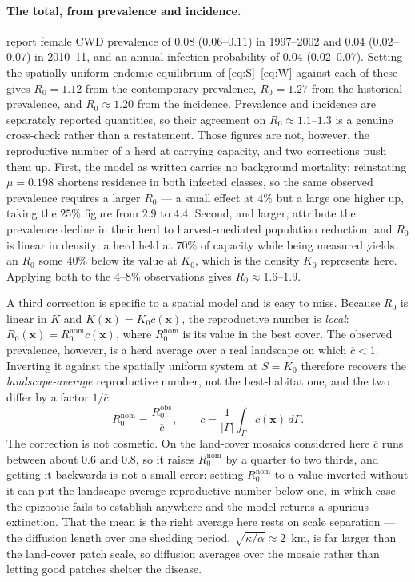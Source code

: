 \documentclass[11pt]{article}
\begin{document}
\paragraph{The total, from prevalence and incidence.} \citet{Geremia2015} report female CWD prevalence of $0.08$ ($0.06$--$0.11$) in 1997--2002 and $0.04$ ($0.02$--$0.07$) in 2010--11, and an annual infection probability of $0.04$ ($0.02$--$0.07$). Setting the spatially uniform endemic equilibrium of \eqref{eq:S}--\eqref{eq:W} against each of these gives $R_0 = 1.12$ from the contemporary prevalence, $R_0 = 1.27$ from the historical prevalence, and $R_0 \approx 1.20$ from the incidence. Prevalence and incidence are separately reported quantities, so their agreement on $R_0\approx1.1$--$1.3$ is a genuine cross-check rather than a restatement. Those figures are not, however, the reproductive number of a herd at carrying capacity, and two corrections push them up. First, the model as written carries no background mortality; reinstating $\mu = 0.198$ shortens residence in both infected classes, so the same observed prevalence requires a larger $R_0$ --- a small effect at $4\%$ but a large one higher up, taking the $25\%$ figure from $2.9$ to $4.4$. Second, and larger, \citeauthor{Geremia2015} attribute the prevalence decline in their herd to harvest-mediated population reduction, and $R_0$ is linear in density: a herd held at $70\%$ of capacity while being measured yields an $R_0$ some $40\%$ below its value at $K_0$, which is the density $K_0$ represents here. Applying both to the $4$--$8\%$ observations gives $R_0 \approx 1.6$--$1.9$.

A third correction is specific to a spatial model and is easy to miss. Because $R_0$ is linear in $K$ and $K(\mathbf{x}) = K_0 c(\mathbf{x})$, the reproductive number is \emph{local}: $R_0(\mathbf{x}) = R_0^{\text{nom}} c(\mathbf{x})$, where $R_0^{\text{nom}}$ is its value in the best cover. The observed prevalence, however, is a herd average over a real landscape on which $\overline{c} < 1$. Inverting it against the spatially uniform system at $S = K_0$ therefore recovers the \emph{landscape-average} reproductive number, not the best-habitat one, and the two differ by a factor $1/\overline{c}$:
\begin{equation}
R_0^{\text{nom}} = \frac{R_0^{\text{obs}}}{\overline{c}},
\qquad
\overline{c} = \frac{1}{|\Gamma|}\int_\Gamma c(\mathbf{x})\,d\Gamma .
\label{eq:R0-meanc}
\end{equation}
The correction is not cosmetic. On the land-cover mosaics considered here $\overline{c}$ runs between about $0.6$ and $0.8$, so it raises $R_0^{\text{nom}}$ by a quarter to two thirds, and getting it backwards is not a small error: setting $R_0^{\text{nom}}$ to a value inverted without it can put the landscape-average reproductive number below one, in which case the epizootic fails to establish anywhere and the model returns a spurious extinction. That the mean is the right average here rests on scale separation --- the diffusion length over one shedding period, $\sqrt{\kappa/\alpha} \approx 2$~km, is far larger than the land-cover patch scale, so diffusion averages over the mosaic rather than letting good patches shelter the disease.
\end{document}

